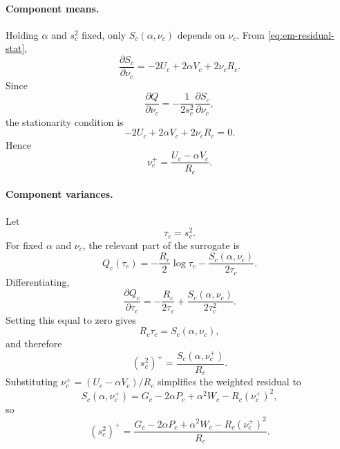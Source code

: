 \paragraph{Component means.}

Holding $\alpha$ and $s_c^2$ fixed, only
$S_c(\alpha,\nu_c)$ depends on $\nu_c$. From
\eqref{eq:em-residual-stat},
\begin{equation}
  \frac{\partial S_c}{\partial\nu_c}
  =
  -2U_c
  +2\alpha V_c
  +2\nu_cR_c.
\end{equation}
Since
\begin{equation}
  \frac{\partial Q}{\partial\nu_c}
  =
  -\frac{1}{2s_c^2}
  \frac{\partial S_c}{\partial\nu_c},
\end{equation}
the stationarity condition is
\begin{equation}
  -2U_c
  +2\alpha V_c
  +2\nu_cR_c
  =
  0.
\end{equation}
Hence
\begin{equation}
  \boxed{
  \nu_c^{+}
  =
  \frac{
    U_c-\alpha V_c
  }{R_c}.
  }
  \label{eq:em-mstep-nu}
\end{equation}

\paragraph{Component variances.}

Let
\[
  \tau_c=s_c^2.
\]
For fixed $\alpha$ and $\nu_c$, the relevant part of the surrogate is
\begin{equation}
  Q_c(\tau_c)
  =
  -\frac{R_c}{2}\log\tau_c
  -
  \frac{S_c(\alpha,\nu_c)}{2\tau_c}.
\end{equation}
Differentiating,
\begin{equation}
  \frac{\partial Q_c}{\partial\tau_c}
  =
  -\frac{R_c}{2\tau_c}
  +
  \frac{
    S_c(\alpha,\nu_c)
  }{2\tau_c^2}.
\end{equation}
Setting this equal to zero gives
\begin{equation}
  R_c\tau_c
  =
  S_c(\alpha,\nu_c),
\end{equation}
and therefore
\begin{equation}
  (s_c^2)^{+}
  =
  \frac{
    S_c(\alpha,\nu_c^{+})
  }{R_c}.
  \label{eq:em-mstep-var-general}
\end{equation}
Substituting
$\nu_c^{+}=(U_c-\alpha V_c)/R_c$ simplifies the weighted residual to
\begin{equation}
  S_c(\alpha,\nu_c^{+})
  =
  G_c
  -2\alpha P_c
  +\alpha^2W_c
  -
  R_c(\nu_c^{+})^2,
\end{equation}
so
\begin{equation}
  \boxed{
  (s_c^2)^{+}
  =
  \frac{
    G_c
    -2\alpha P_c
    +\alpha^2W_c
    -R_c(\nu_c^{+})^2
  }{R_c}.
  }
  \label{eq:em-mstep-var}
\end{equation}

